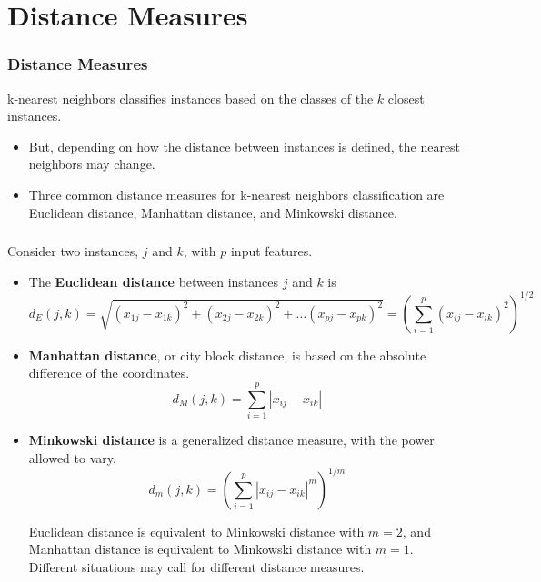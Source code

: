 \documentclass[8pt,dvipsnames]{beamer}
\begin{document}
\section{Distance Measures}
\begin{frame}
	\frametitle{Distance Measures}
	k-nearest neighbors classifies instances based on the classes of the \(k\) closest instances.
	\begin{itemize}
		\item But, depending on how the distance between instances is defined, the nearest neighbors may change.
		\item  Three common distance measures for k-nearest neighbors
		      classification are Euclidean distance, Manhattan distance, and Minkowski distance.
	\end{itemize}

\end{frame}
\begin{frame}
	\frametitle{}
	Consider two instances, \(j\) and \(k\), with \(p\) input features.
	\begin{itemize}
		\item  The \textbf{Euclidean distance} between instances \(j\) and \(k\) is
		      $$
			      d_{E}(j, k)=\sqrt{\left(x_{1 j}-x_{1 k}\right)^{2}+\left(x_{2 j}-x_{2 k}\right)^{2}+\ldots\left(x_{p j}-x_{p k}\right)^{2}}=\left(\sum_{i=1}^{p}\left(x_{i j}-x_{i k}\right)^{2}\right)^{1 / 2}
		      $$
		\item \textbf{Manhattan distance}, or city block distance, is based on the absolute difference of the coordinates.
		      $$
			      d_{M}(j, k)=\sum_{i=1}^{p}\left|x_{i j}-x_{i k}\right|
		      $$
		\item \textbf{Minkowski distance}  is a generalized distance measure, with the power allowed to vary.
		      $$
			     d_{m}(j, k)=\left(\sum_{i=1}^{p}\left|x_{i j}-x_{i k}\right|^m\right)^{1 / m}
		      $$

		      Euclidean distance is equivalent to Minkowski distance with \(m=2\), and Manhattan distance is equivalent to Minkowski
		      distance with \(m=1\). Different situations may call for different distance measures.
	\end{itemize}
\end{frame}
\end{document}

